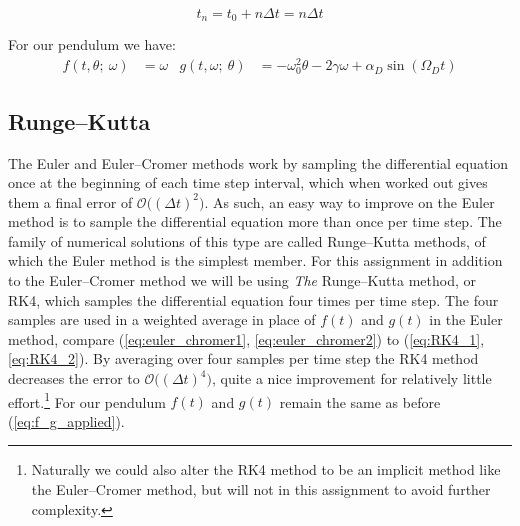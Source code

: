 \documentclass[notitlepage,aps,prd,nofootinbib]{revtex4-1}
\DeclareRobustCommand{\orderof}{\ensuremath{\mathcal{O}}}
\begin{document}
\begin{equation} \label{eq:tn} 
t_{n} = t_{0} + n \Delta t = n \Delta t
\end{equation}

For our pendulum we have:
\begin{align} \label{eq:f_g_applied}
f\left(t, \theta;~\omega\right) &=  \omega &
g\left(t, \omega;~\theta\right) &= -\omega_{0}^2 \theta - 2\gamma \omega + \alpha_{D}\sin\left(\Omega_{D} t\right)
\end{align}

\subsection{Runge--Kutta}
\label{subsec:runge_kutta}
The Euler and Euler--Cromer methods work by sampling the differential equation once at the beginning of each time step interval, which when worked out gives them a final error of $\orderof\big(\left(\Delta t\right)^2\big)$. As such, an easy way to improve on the Euler method is to sample the differential equation more than once per time step. The family of numerical solutions of this type are called Runge--Kutta methods, of which the Euler method is the simplest member. For this assignment in addition to the Euler--Cromer method we will be using \textit{The} Runge--Kutta method, or RK4, which samples the differential equation four times per time step. The four samples are used in a weighted average in place of $f\left(t\right)$ and $g\left(t\right)$ in the Euler method, compare (\ref{eq:euler_chromer1}, \ref{eq:euler_chromer2}) to (\ref{eq:RK4_1}, \ref{eq:RK4_2}). By averaging over four samples per time step the RK4 method decreases the error to $\orderof\big(\left(\Delta t\right)^4\big)$, quite a nice improvement for relatively little effort.\footnote{Naturally we could also alter the RK4 method to be an implicit method like the Euler--Cromer method, but will not in this assignment to avoid further complexity.} For our pendulum $f\left(t\right)$ and $g\left(t\right)$ remain the same as before (\ref{eq:f_g_applied}).
\end{document}
